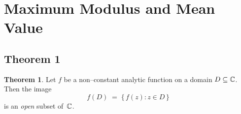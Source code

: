 \documentclass[12pt]{article}
\title{}
\author{Jerich Lee}
\date{\today}
\theoremstyle{definition} %
\newtheorem{theorem}{Theorem}
\theoremstyle{plain} %
\begin{document}
\maketitle
\section*{Maximum Modulus and Mean Value}

\subsection*{Theorem 1}
\begin{theorem}
Let $f$ be a non–constant analytic function on a domain $D\subseteq\Bbb C$.  
Then the image
\[
      f(D)\;=\;\{\,f(z): z\in D\,\}
\]
is an \emph{open} subset of~$\Bbb C$.
\end{theorem}
\end{document}
